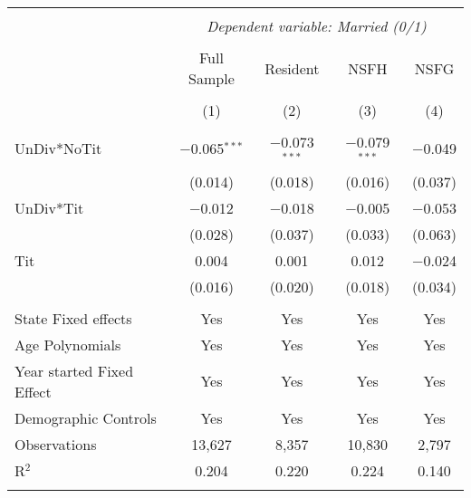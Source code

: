 
\begingroup 
\footnotesize 
\begin{tabular}{@{\extracolsep{5pt}}lcccc} 
\\[-1.8ex]\hline 
\hline \\[-1.8ex] 
 & \multicolumn{4}{c}{\textit{Dependent variable: Married (0/1)}} \\
\cline{2-5} \\[-1.0ex]
 & Full Sample & Resident & NSFH & NSFG \\ 
\\[-1.8ex] & (1) & (2) & (3) & (4)\\ 
\hline \\[-1.8ex] 
 UnDiv*NoTit & $-$0.065$^{***}$ & $-$0.073$^{***}$ & $-$0.079$^{***}$ & $-$0.049 \\ 
  & (0.014) & (0.018) & (0.016) & (0.037) \\ 
  UnDiv*Tit & $-$0.012 & $-$0.018 & $-$0.005 & $-$0.053 \\ 
  & (0.028) & (0.037) & (0.033) & (0.063) \\ 
  Tit & 0.004 & 0.001 & 0.012 & $-$0.024 \\ 
  & (0.016) & (0.020) & (0.018) & (0.034) \\ 
 \hline \\[-1.8ex] 
State Fixed effects & Yes & Yes & Yes & Yes \\ 
Age Polynomials & Yes & Yes & Yes & Yes \\ 
Year started Fixed Effect & Yes & Yes & Yes & Yes \\ 
Demographic Controls & Yes & Yes & Yes & Yes \\ 
Observations & 13,627 & 8,357 & 10,830 & 2,797 \\ 
R$^{2}$ & 0.204 & 0.220 & 0.224 & 0.140 \\ 
\hline 
\hline \\[-1.8ex] 
\end{tabular} 
\endgroup 
